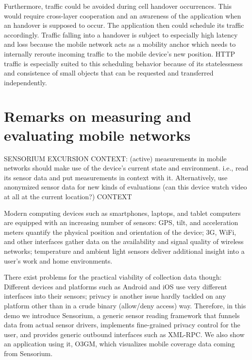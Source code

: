 Furthermore, traffic could be avoided during cell handover occurrences. This would require cross-layer cooperation and an awareness of the application when an handover is supposed to occur. The application then could schedule its traffic accordingly. Traffic falling into a handover is subject to especially high latency and loss because the mobile network acts as a mobility anchor which needs to internally reroute incoming traffic to the mobile device's new position. HTTP traffic is especially suited to this scheduling behavior because of its statelessness and consistence of small objects that can be requested and transferred independently.



\section{Remarks on measuring and evaluating mobile networks}

SENSORIUM EXCURSION
CONTEXT: (active) measurements in mobile networks should make use of the device's current state and environment. i.e., read its sensor data and put measurements in context with it. Alternatively, use anonymized sensor data for new kinds of evaluations (can this device watch video at all at the current location?)
CONTEXT

Modern computing devices such as smartphones, laptops, and tablet computers are equipped with an increasing number of sensors: GPS, tilt, and acceleration meters quantify the physical position and orientation of the device; 3G, WiFi, and other  interfaces gather data on the availability and signal quality of wireless networks; temperature and ambient light sensors deliver additional insight into a user's work and home environments.

There exist problems for the practical viability of collection data though: Different devices and platforms such as Android and iOS use very different interfaces into their sensors; privacy is another issue hardly tackled on any platform other than in a crude binary (allow/deny access) way. Therefore, in this demo we introduce Sensorium, a generic sensor reading framework that funnels data from actual sensor drivers, implements fine-grained privacy control for the user, and provides generic outbound interfaces such as XML-RPC. We also show an application using it, O3GM, which visualizes mobile coverage data coming from Sensorium.

